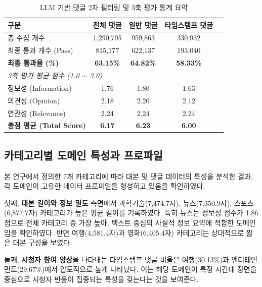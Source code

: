 \documentclass[11pt,a4paper]{article}
\begin{document}
\begin{table}[htbp]
  \centering
  \caption{LLM 기반 댓글 2차 필터링 및 3축 평가 통계 요약}
  \vspace{3mm}
  \begin{tabular}{lcccc}
    \toprule
    \textbf{구분} & \textbf{전체 댓글} & \textbf{일반 댓글} & \textbf{타임스탬프 댓글} \\
    \midrule
    총 수집 개수 & 1,290,795 & 959,863 & 330,932 \\
    최종 통과 개수 (Pass) & 815,177 & 622,137 & 193,040 \\
    \textbf{최종 통과율 (\%)} & \textbf{63.15\%} & \textbf{64.82\%} & \textbf{58.33\%} \\
    \midrule
    \multicolumn{4}{l}{\textit{3축 평가 평균 점수 (1.0 $\sim$ 3.0)}} \\
    \hspace{1em} 정보성 (Information) & 1.76 & 1.80 & 1.63 \\
    \hspace{1em} 의견성 (Opinion) & 2.18 & 2.20 & 2.12 \\
    \hspace{1em} 연관성 (Relevance) & 2.24 & 2.24 & 2.24 \\
    \midrule
    \textbf{총점 평균 (Total Score)} & \textbf{6.17} & \textbf{6.23} & \textbf{6.00} \\
    \bottomrule
  \end{tabular}
  \label{tab:filter_results}
\end{table}

\subsection{카테고리별 도메인 특성과 프로파일}\label{subsec:domain_analysis}

본 연구에서 정의한 7개 카테고리에 따라 대본 및 댓글 데이터의 특성을 분석한 결과, 각 도메인이 고유한 데이터 프로파일을 형성하고 있음을 확인하였다.

첫째, \textbf{대본 길이와 정보 밀도} 측면에서 과학기술(7,474.7자), 뉴스(7,350.9자), 스포츠(6,877.7자) 카테고리가 높은 평균 길이를 기록하였다. 특히 뉴스는 정보성 점수가 1.86점으로 전체 카테고리 중 가장 높아, 텍스트 중심의 사실적 정보 요약에 적합한 도메인임을 확인하였다. 반면 여행(4,581.4자)과 영화(6,405.4자) 카테고리는 상대적으로 짧은 대본 구성을 보였다.

둘째, \textbf{시청자 참여 양상}을 나타내는 타임스탬프 댓글 비율은 여행(30.13\%)과 엔터테인먼트(29.67\%)에서 압도적으로 높게 나타났다. 이는 해당 도메인이 특정 시간대 장면을 중심으로 시청자 반응이 집중되는 특성을 갖는다는 것을 보여준다.
\end{document}
